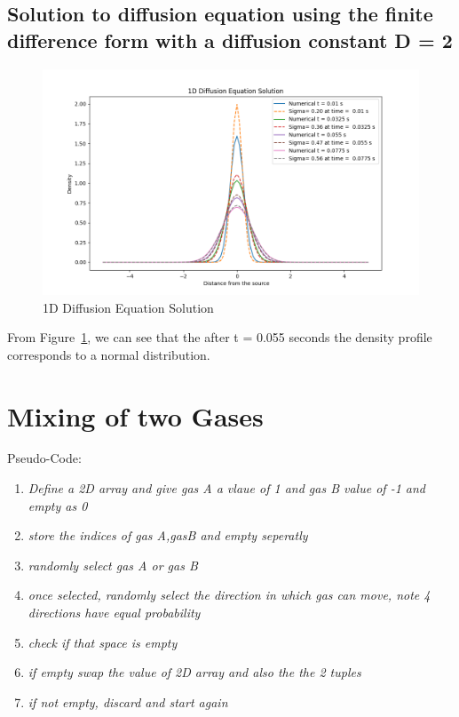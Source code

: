 \documentclass[11pt]{article}
\begin{document}
\subsection{Solution to diffusion equation using the finite difference form with a diffusion constant D = 2}
\begin{figure}[H]
    \centering
    \includegraphics[width=1\textwidth, keepaspectratio]{1D Diffusion Equation Solution.png}
    \caption{1D Diffusion Equation Solution}
    \label{fig:20}
\end{figure}
From Figure~\ref{fig:20}, we can see that the after t = 0.055 seconds the density profile corresponds to a normal distribution.

\section{Mixing of two Gases}
Pseudo-Code:
\begin{enumerate}
    \item \textit{Define a 2D array and give gas A a vlaue of 1 and gas B value of -1 and empty as 0}
    \item \textit{store the indices of gas A,gasB and empty seperatly}
    \item \textit{randomly select gas A or gas B}
    \item \textit{once selected, randomly select the direction in which gas can move, note 4 directions have equal probability}
    \item \textit{check if that space is empty}
    \item \textit{if empty swap the value of 2D array and also the the 2 tuples}
    \item \textit{if not empty, discard and start again}
\end{enumerate}
\end{document}
